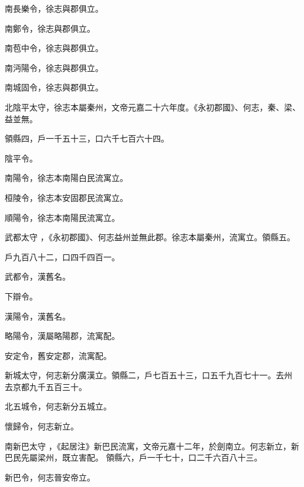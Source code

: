 \begin{pinyinscope}
 南長樂令，徐志與郡俱立。



 南鄭令，徐志與郡俱立。



 南苞中令，徐志與郡俱立。



 南沔陽令，徐志與郡俱立。



 南城固令，徐志與郡俱立。



 北陰平太守，徐志本屬秦州，文帝元嘉二十六年度。《永初郡國》、何志，秦、梁、益並無。



 領縣四，戶一千五十三，口六千七百六十四。


陰平令。



 南陽令，徐志本南陽白民流寓立。



 桓陵令，徐志本安固郡民流寓立。



 順陽令，徐志本南陽民流寓立。


武都太守
 ，《永初郡國》、何志益州並無此郡。徐志本屬秦州，流寓立。領縣五。



 戶九百八十二，口四千四百一。



 武都令，漢舊名。


下辯令。



 漢陽令，漢舊名。



 略陽令，漢屬略陽郡，流寓配。



 安定令，舊安定郡，流寓配。


新城太守，何志新分廣漢立。領縣二，戶七百五十三，口五千九百七十一。去州
 去京都九千五百三十。



 北五城令，何志新分五城立。



 懷歸令，何志新立。


南新巴太守
 ，《起居注》新巴民流寓，文帝元嘉十二年，於劍南立。何志新立，新巴民先屬梁州，既立害配。
 領縣六，戶一千七十，口二千六百八十三。



 新巴令，何志晉安帝立。




\end{pinyinscope}
